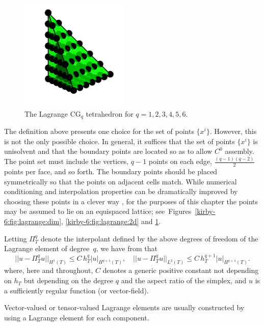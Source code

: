 \begin{figure}
\begin{center}
    \includegraphics[width=5.2cm]{chapters/kirby-6/png/CG6_3d.png}
    \caption{The Lagrange $\mathrm{CG}_{q}$ tetrahedron for $q = 1, 2,
      3, 4, 5, 6$.}
    \label{kirby-6:fig:lagrange:3d}
  \end{center}
\end{figure}

The definition above presents one choice for the set of points
$\{x^i\}$. However, this is not the only possible choice. In general,
it suffices that the set of points $\{x^i\}$ is unisolvent and that
the boundary points are located so as to allow $C^0$ assembly. The
point set must include the vertices, $q-1$ points on each edge,
$\frac{(q-1)(q-2)}{2}$ points per face, and so forth. The boundary
points should be placed symmetrically so that the points on adjacent
cells match. While numerical conditioning and interpolation properties
can be dramatically improved by choosing these points in a clever way
\citep{Warburton2005}, for the purposes of this chapter the points
may be assumed to lie on an equispaced lattice;
see~Figures~\ref{kirby-6:fig:lagrange:dim},
\ref{kirby-6:fig:lagrange:2d} and \ref{kirby-6:fig:lagrange:3d}.

Letting $\Pi_T^q$ denote the interpolant defined by the above degrees
of freedom of the Lagrange element of degree~$q$, we have
from \citet{BrennerScott2008} that
\begin{equation}
  ||u - \Pi_T^q u||_{H^1(T)} \leqslant C \, h_T^{q} |u|_{H^{q+1}(T)}, \quad
  ||u - \Pi_T^q u||_{L^2(T)} \leqslant C \, h_T^{q+1} |u|_{H^{q+1}(T)}.
\end{equation}
where, here and throughout, $C$ denotes a generic positive constant
not depending on $h_T$ but depending on the degree $q$ and the aspect
ratio of the simplex, and $u$ is a sufficiently regular function (or
vector-field).

Vector-valued or tensor-valued Lagrange elements are usually constructed
by using a Lagrange element for each component.

